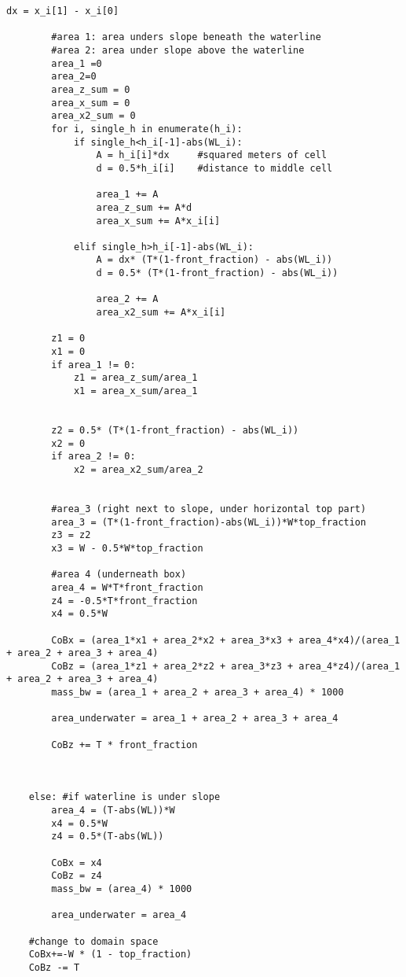 \begin{mdframed}[backgroundcolor=light-gray, roundcorner=10pt,leftmargin=1, rightmargin=1, innerleftmargin=0, innertopmargin=7,innerbottommargin=0, outerlinewidth=1, linecolor=light-gray]
\begin{lstlisting}[linewidth=\columnwidth,caption=Functions used in setting up simulations ., label=script:setting up simulations]
        dx = x_i[1] - x_i[0]

        #area 1: area unders slope beneath the waterline
        #area 2: area under slope above the waterline
        area_1 =0
        area_2=0
        area_z_sum = 0
        area_x_sum = 0
        area_x2_sum = 0
        for i, single_h in enumerate(h_i):
            if single_h<h_i[-1]-abs(WL_i):
                A = h_i[i]*dx     #squared meters of cell
                d = 0.5*h_i[i]    #distance to middle cell

                area_1 += A
                area_z_sum += A*d
                area_x_sum += A*x_i[i]

            elif single_h>h_i[-1]-abs(WL_i):
                A = dx* (T*(1-front_fraction) - abs(WL_i))
                d = 0.5* (T*(1-front_fraction) - abs(WL_i))

                area_2 += A
                area_x2_sum += A*x_i[i]

        z1 = 0
        x1 = 0
        if area_1 != 0:
            z1 = area_z_sum/area_1
            x1 = area_x_sum/area_1


        z2 = 0.5* (T*(1-front_fraction) - abs(WL_i))
        x2 = 0
        if area_2 != 0:
            x2 = area_x2_sum/area_2


        #area_3 (right next to slope, under horizontal top part)
        area_3 = (T*(1-front_fraction)-abs(WL_i))*W*top_fraction
        z3 = z2
        x3 = W - 0.5*W*top_fraction

        #area 4 (underneath box)
        area_4 = W*T*front_fraction
        z4 = -0.5*T*front_fraction
        x4 = 0.5*W

        CoBx = (area_1*x1 + area_2*x2 + area_3*x3 + area_4*x4)/(area_1 + area_2 + area_3 + area_4)
        CoBz = (area_1*z1 + area_2*z2 + area_3*z3 + area_4*z4)/(area_1 + area_2 + area_3 + area_4)
        mass_bw = (area_1 + area_2 + area_3 + area_4) * 1000

        area_underwater = area_1 + area_2 + area_3 + area_4

        CoBz += T * front_fraction



    else: #if waterline is under slope
        area_4 = (T-abs(WL))*W
        x4 = 0.5*W
        z4 = 0.5*(T-abs(WL))

        CoBx = x4
        CoBz = z4
        mass_bw = (area_4) * 1000

        area_underwater = area_4

    #change to domain space
    CoBx+=-W * (1 - top_fraction)
    CoBz -= T




\end{lstlisting}
\end{mdframed}
